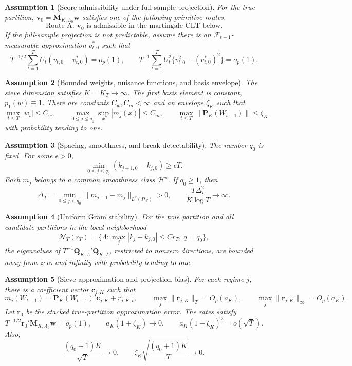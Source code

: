 \documentclass[12pt]{article}
\numberwithin{equation}{section}
\newtheorem{assumption}{Assumption}
\theoremstyle{definition}
\newcommand{\F}{\mathcal F}
\begin{document}
\begin{assumption}[Score admissibility under full-sample projection]
\label{ass:prim-score-admissible}
For the true partition, \(\bm v_0=\bm M_{K,\Lambda_0}\bm w\) satisfies one of the following primitive routes.
\[
    \text{Route A: } \bm v_0 \text{ is admissible in the martingale CLT below.}
\]
If the full-sample projection is not predictable, assume there is an
\(\F_{t-1}\)-measurable approximation \(v_{t,0}^\ast\) such that
\[
    T^{-1/2}\sum_{t=1}^T U_t(v_{t,0}-v_{t,0}^\ast)=o_p(1),
    \qquad
    T^{-1}\sum_{t=1}^T U_t^2\{v_{t,0}^2-(v_{t,0}^\ast)^2\}=o_p(1).
\]
\end{assumption}

\begin{assumption}[Bounded weights, nuisance functions, and basis envelope]
\label{ass:prim-bounded}
The sieve dimension satisfies \(K=K_T\to\infty\). The first basis element is constant, \(p_1(w)\equiv1\). There are constants \(C_w,C_m<\infty\) and an envelope \(\zeta_K\) such that
\[
    \max_{t\leq T}|w_t|\leq C_w,
    \qquad
    \max_{0\leq j\leq q_0}\sup_x|m_j(x)|\leq C_m,
    \qquad
    \max_{t\leq T}\|\bm P_K(W_{t-1})\|\leq \zeta_K
\]
with probability tending to one.
\end{assumption}

\begin{assumption}[Spacing, smoothness, and break detectability]
\label{ass:prim-breaks}
The number \(q_0\) is fixed. For some \(\epsilon>0\),
\[
    \min_{0\leq j\leq q_0}(k_{j+1,0}-k_{j,0})\geq \epsilon T.
\]
Each \(m_j\) belongs to a common smoothness class \(\mathcal H^s\). If \(q_0\geq1\), then
\[
    \Delta_T=\min_{0\leq j<q_0}\|m_{j+1}-m_j\|_{L^2(P_W)}>0,
    \qquad
    \frac{T\Delta_T^2}{K\log T}\to\infty.
\]
\end{assumption}

\begin{assumption}[Uniform Gram stability]
\label{ass:prim-gram}
For the true partition and all candidate partitions in the local neighborhood
\[
    \mathcal N_T(r_T)
    =
    \{\Lambda:\max_j|k_j-k_{j,0}|\leq C r_T,\ q=q_0\},
\]
the eigenvalues of \(T^{-1}\bm Q_{K,\Lambda}'\bm Q_{K,\Lambda}\), restricted to nonzero directions, are bounded away from zero and infinity with probability tending to one.
\end{assumption}

\begin{assumption}[Sieve approximation and projection bias]
\label{ass:prim-sieve}
For each regime \(j\), there is a coefficient vector \(\bm c_{j,K}\) such that
\[
    m_j(W_{t-1})
    =
    \bm P_K(W_{t-1})'\bm c_{j,K}+r_{j,K,t},
    \qquad
    \max_j\|\bm r_{j,K}\|_T=O_p(a_K),
    \qquad
    \max_j\|\bm r_{j,K}\|_\infty=O_p(a_K).
\]
Let \(\bm r_0\) be the stacked true-partition approximation error. The rates satisfy
\[
    T^{-1/2}\bm r_0'\bm M_{K,\Lambda_0}\bm w=o_p(1),
    \qquad
    a_K(1+\zeta_K)\to0,
    \qquad
    a_K(1+\zeta_K)^2=o(\sqrt T).
\]
Also,
\[
    \frac{(q_0+1)K}{\sqrt T}\to0,
    \qquad
    \zeta_K\sqrt{\frac{(q_0+1)K}{T}}\to0.
\]
\end{assumption}
\end{document}
